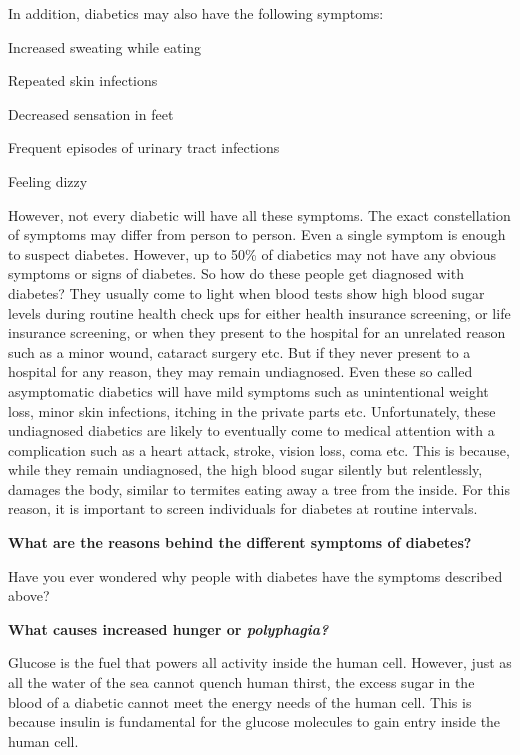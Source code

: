 In addition, diabetics may also have the following symptoms:

\item Increased sweating while eating

 \item Repeated skin infections

 \item Decreased sensation in feet

 \item Frequent episodes of urinary tract infections

 \item Feeling dizzy

However, not every diabetic will have all these symptoms. The exact constellation of symptoms may differ from person to person. Even a single symptom is enough to suspect diabetes. However, up to 50\% of diabetics may not have any obvious symptoms or signs of diabetes. So how do these people get diagnosed with diabetes? They usually come to light when blood tests show high blood sugar levels during routine health check ups for either health insurance screening, or life insurance screening, or when they present to the hospital for an unrelated reason such as a minor wound, cataract surgery etc. But if they never present to a hospital for any reason, they may remain undiagnosed. Even these so called asymptomatic diabetics will have mild symptoms such as unintentional weight loss, minor skin infections, itching in the private parts etc. Unfortunately, these undiagnosed diabetics are likely to eventually come to medical attention with a complication such as a heart attack, stroke, vision loss, coma etc. This is because, while they remain undiagnosed, the high blood sugar silently but relentlessly, damages the body, similar to termites eating away a tree from the inside. For this reason, it is important to screen individuals for diabetes at routine intervals.

\textbf{What are the reasons behind the different symptoms of diabetes?}

Have you ever wondered why people with diabetes have the symptoms described above?

\textbf{What causes increased hunger or \textit{polyphagia?}}

Glucose is the fuel that powers all activity inside the human cell. However, just as all the water of the sea cannot quench human thirst, the excess sugar in the blood of a diabetic cannot meet the energy needs of the human cell. This is because insulin is fundamental for the glucose molecules to gain entry inside the human cell.

